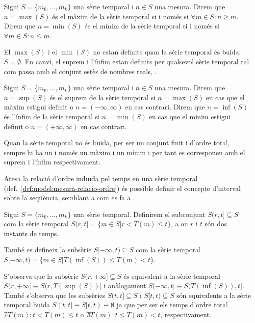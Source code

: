 \begin{definition}
  Sigui $S=\{m_0,\ldots,m_k\}$ una sèrie temporal i $n\in S$ una
  mesura.  Direm que $n=\max(S)$ és el màxim de la sèrie temporal si i
  només si $\forall m \in S: n \geq m $.  Direm que $n=\min(S)$ és el
  mínim de la sèrie temporal si i només si $\forall m \in S: n \leq
  m$.
\end{definition}

El $\max(S)$ i el $\min(S)$ no estan definits quan la sèrie temporal
és buida: $S= \emptyset$. En
canvi, el suprem i l'ínfim estan definits per qualsevol
sèrie temporal tal com passa amb el conjunt estès de nombres reals,
\cite{cantrell:extendedreal}.  

\begin{definition}
  Sigui $S=\{m_0,\ldots,m_k\}$ una sèrie temporal i $n\in S$ una
  mesura.  Direm que $n=\sup(S)$ és el suprem de la sèrie temporal si
  $n=\max(S)$ en cas que el màxim estigui definit o
  $n=(-\infty,\infty)$ en cas contrari.  Direm que $n=\inf(S)$ és
  l'ínfim de la sèrie temporal si $n=\min(S)$ en cas que el mínim
  estigui definit o $n=(+\infty,\infty)$ en cas contrari.
\end{definition}
Quan la sèrie temporal no és buida, per
ser un conjunt finit i d'ordre total, sempre hi ha un i només un màxim
i un mínim i per tant es corresponen amb el suprem i l'ínfim
respectivament.


Atesa la relació d'ordre induïda pel temps en una sèrie temporal
(def.\ \ref{def:model:mesura-relacio-ordre}) és possible definir el
concepte d'interval sobre la seqüència, semblant a com es fa a \cite{last:keogh,last:hetland}.

\begin{definition}[Interval]
  \label{def:model:st-interval}
  Sigui $S=\{m_0, \ldots, m_k\}$ una sèrie temporal. Definirem el subconjunt
  $S(r,t] \subseteq S$ com la sèrie temporal $S(r,t]=\{m\in S
  | r<T(m)\leq t\}$, a on $r$ i $t$ són dos instants de temps.

  També es defineix la subsèrie $S[-\infty,t)\subseteq S$ com la sèrie
  temporal $S[-\infty,t) = \{m\in S | T(\inf(S))\leq T(m) < t\}$.
\end{definition}
S'observa que la subsèrie $S(r,+\infty]\subseteq S$ és
equivalent a la sèrie temporal $S(r,+\infty] \equiv S(r,T(\sup(S))]$ i
anàlogament $S(-\infty,t] \equiv S(T(\inf(S)),t]$. També s'observa que les subsèries $S(t,t]\subseteq S$ i $S[t,t)\subseteq S$ són equivalents a la sèrie temporal buida $S(t,t] \equiv S[t,t) \equiv \emptyset$ ja que per ser els temps d'ordre total $\nexists T(m): t < T(m) \leq t$ o $\nexists T(m): t \leq T(m) < t$, respectivament. 
 
